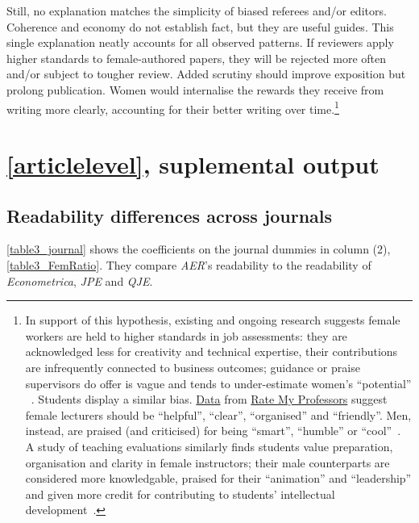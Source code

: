\begin{appendices}
\begin{refsection}
Still, no explanation matches the simplicity of biased referees and\slash or editors. Coherence and economy do not establish fact, but they are useful guides. This single explanation neatly accounts for all observed patterns. If reviewers apply higher standards to female-authored papers, they will be rejected more often and\slash or subject to tougher review. Added scrutiny should improve exposition but prolong publication. Women would internalise the rewards they receive from writing more clearly, accounting for their better writing over time.\footnote{In support of this hypothesis, existing and ongoing research suggests female workers are held to higher standards in job assessments: they are acknowledged less for creativity and technical expertise, their contributions are infrequently connected to business outcomes; guidance or praise supervisors do offer is vague and tends to under-estimate women's ``potential'' ~\citep{Correll2016,Benson2021}. Students display a similar bias. \href{http://benschmidt.org/profGender/}{Data} from \href{http://www.ratemyprofessors.com/}{Rate My Professors} suggest female lecturers should be ``helpful'', ``clear'', ``organised'' and ``friendly''. Men, instead, are praised (and criticised) for being ``smart'', ``humble'' or ``cool''~\citep{Schmidt2015}. A study of teaching evaluations similarly finds students value preparation, organisation and clarity in female instructors; their male counterparts are considered more knowledgable, praised for their ``animation'' and ``leadership'' and given more credit for contributing to students' intellectual development~\citep{Boring2017}.}

\clearpage

\section{\autoref{articlelevel}, suplemental output}
\label{appendixarticlelevel}

\subsection{Readability differences across journals}
\label{appendixjournal}

\autoref{table3_journal} shows the coefficients on the journal dummies in column (2), \autoref{table3_FemRatio}. They compare \emph{AER}'s readability to the readability of \emph{Econometrica}, \emph{JPE} and \emph{QJE}.



\clearpage



\end{refsection}
\end{appendices}
